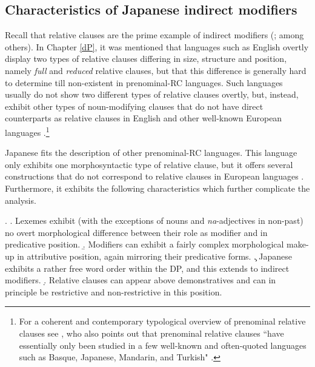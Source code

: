 \documentclass [output=book,colorlinks,citecolor=brown]{langscibook}
\begin{document}
\subsection{Characteristics of Japanese indirect modifiers} \label{nishiyama analysis}

Recall that relative clauses are the prime example of indirect modifiers (\citealt{cinque:2010:adj, cinque:2020:relcl}; among others). In Chapter \ref{dP}, it was mentioned that languages such as English overtly display two types of relative clauses differing in size, structure and position, namely \textit{full} and \textit{reduced} relative clauses, but that this difference is generally hard to determine till non-existent in prenominal-RC languages. Such languages usually do not show two different types of relative clauses overtly, but, instead, exhibit other types of noun-modifying clauses that do not have direct counterparts as relative clauses in English and other well-known European languages \citep{keenan:1977:noun, lehmann:1984:der, vries:2002:syntax, wu:2011:syntax}.\footnote{For a coherent and contemporary typological overview of prenominal relative clauses see \citet{wu:2011:syntax}, who also points out that prenominal relative clauses ``have essentially only been studied in a few well-known and often-quoted languages such as Basque, Japanese, Mandarin, and Turkish" \citep[569]{wu:2011:syntax}.} %

Japanese fits the description of other prenominal-RC languages. This language only exhibits one morphosyntactic type of relative clause, but it offers several constructions that do not correspond to relative clauses in European languages \citep{comrie:1998:rethinking, matsumoto:2017:japanese}. Furthermore, it exhibits the following characteristics which further complicate the analysis.

\newpage

\ex. \a. Lexemes exhibit (with the exceptions of nouns and \textit{na}-adjectives in non-past) no overt morphological difference between their role as modifier and in predicative position.
\b. Modifiers can exhibit a fairly complex morphological make-up in attributive position, again mirroring their predicative forms.
\c. Japanese exhibits a rather free word order within the DP, and this extends to indirect modifiers.
\d. Relative clauses can appear above demonstratives and can in principle be restrictive and non-restrictive in this position.
\end{document}
